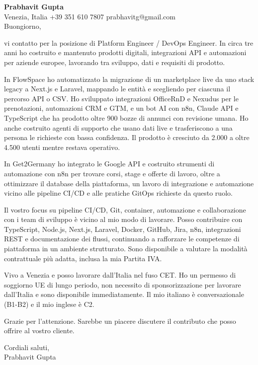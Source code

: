 \documentclass[a4paper,10.5pt]{article}
\begin{document}
\textbf{Prabhavit Gupta}\\
Venezia, Italia \textbar{} +39 351 610 7807 \textbar{} prabhavitg@gmail.com\\[10pt]
Buongiorno,

vi contatto per la posizione di Platform Engineer / DevOps Engineer. In circa tre anni ho costruito e mantenuto prodotti digitali, integrazioni API e automazioni per aziende europee, lavorando tra sviluppo, dati e requisiti di prodotto.

In FlowSpace ho automatizzato la migrazione di un marketplace live da uno stack legacy a Next.js e Laravel, mappando le entità e scegliendo per ciascuna il percorso API o CSV. Ho sviluppato integrazioni OfficeRnD e Nexudus per le prenotazioni, automazioni CRM e GTM, e un bot AI con n8n, Claude API e TypeScript che ha prodotto oltre 900 bozze di annunci con revisione umana. Ho anche costruito agenti di supporto che usano dati live e trasferiscono a una persona le richieste con bassa confidenza. Il prodotto è cresciuto da 2.000 a oltre 4.500 utenti mentre restava operativo.

In Get2Germany ho integrato le Google API e costruito strumenti di automazione con n8n per trovare corsi, stage e offerte di lavoro, oltre a ottimizzare il database della piattaforma, un lavoro di integrazione e automazione vicino alle pipeline CI/CD e alle pratiche GitOps richieste da questo ruolo.

Il vostro focus su pipeline CI/CD, Git, container, automazione e collaborazione con i team di sviluppo è vicino al mio modo di lavorare. Posso contribuire con TypeScript, Node.js, Next.js, Laravel, Docker, GitHub, Jira, n8n, integrazioni REST e documentazione dei flussi, continuando a rafforzare le competenze di piattaforma in un ambiente strutturato. Sono disponibile a valutare la modalità contrattuale più adatta, inclusa la mia Partita IVA.

Vivo a Venezia e posso lavorare dall'Italia nel fuso CET. Ho un permesso di soggiorno UE di lungo periodo, non necessito di sponsorizzazione per lavorare dall'Italia e sono disponibile immediatamente. Il mio italiano è conversazionale (B1-B2) e il mio inglese è C2.

Grazie per l'attenzione. Sarebbe un piacere discutere il contributo che posso offrire al vostro cliente.

Cordiali saluti,\\
Prabhavit Gupta
\end{document}
